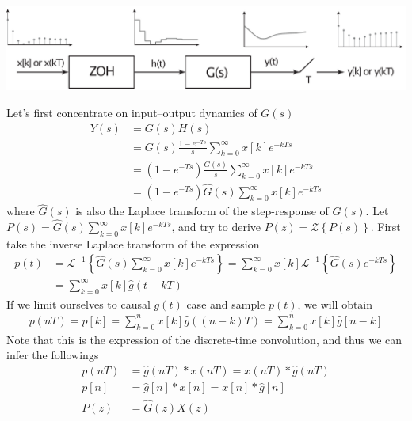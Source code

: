 \documentclass[twoside]{article}
\begin{document}
%
    \begin{center}
\begin{minipage}[h]{0.99\linewidth}
    \begin{center}
      \includegraphics[width=\textwidth]{DCS}
    \end{center}
\end{minipage}
    \end{center}
%
Let's first concentrate on input--output dynamics of $G(s)$
%
\begin{align*}
Y(s) &= G(s)  H(s)
\\
&= G(s)  \frac{1 - e^{-Ts}}{s} \sum\limits_{k=0}^{\infty} x[k] e^{-k T s}
\\
&= \left( 1 - e^{-Ts} \right)  \frac{G(s) }{s} \sum\limits_{k=0}^{\infty} x[k] e^{-k T s}
\\
&= \left( 1 - e^{-Ts} \right)  
\hat{G}(s) \sum\limits_{k=0}^{\infty} x[k] e^{-k T s}
\end{align*}
%
where $\hat{G}(s)$ is also the Laplace transform of the step-response of $G(s)$. 
Let $P(s) =  \hat{G}(s) \sum\limits_{k=0}^{\infty} x[k] e^{-k T s}$, and try to derive
$P(z) = \mathcal{Z} \left\lbrace P(s) \right\rbrace$. First take the inverse Laplace
transform of the expression
%
\begin{align*}
p(t) &= \mathcal{L}^{-1} \left\lbrace \hat{G}(s) \sum\limits_{k=0}^{\infty} x[k] e^{-k T s} \right\rbrace
= \sum\limits_{k=0}^{\infty} x[k] \mathcal{L}^{-1} \left\lbrace \hat{G}(s) e^{-k T s} \right\rbrace
\\
&= \sum\limits_{k=0}^{\infty} x[k] \hat{g}(t - k T) 
\end{align*}
%
If we limit ourselves to causal $g(t)$ case and sample $p(t)$, we will obtain
%
\begin{align*}
p( n T) = p[k] =  \sum\limits_{k=0}^{n} x[k] \hat{g}( \left(n - k\right) T) = \sum\limits_{k=0}^{n} x[k] \hat{g}[ n - k ]
\end{align*}
%
Note that this is the expression of the discrete-time convolution, and thus we can infer the followings 
%
\begin{align*}
p(n T) &= \hat{g}(nT) \ast x(nT) = x(nT) \ast \hat{g}(nT) 
\\
p[n] &= \hat{g}[n] \ast x[n] = x[n] \ast \hat{g}[n] 
\\
P(z) &= \hat{G}(z) X(z)
\end{align*}
\end{document}
